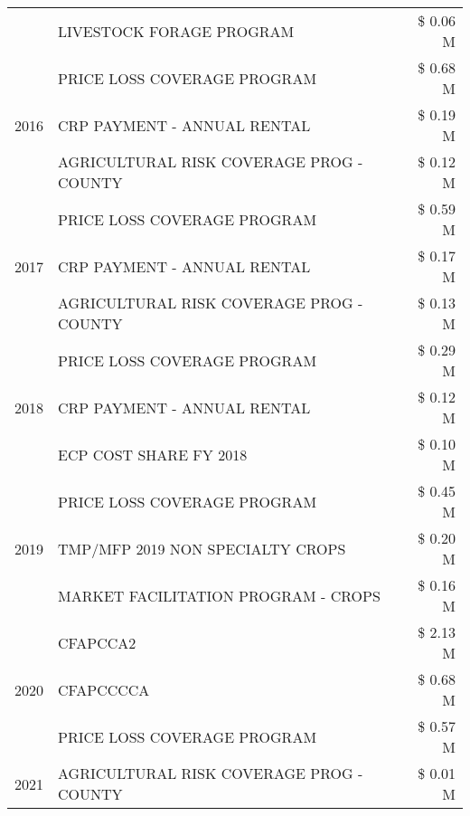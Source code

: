 \begin{tabular}{llr}
 & LIVESTOCK FORAGE PROGRAM & \$ 0.06 M \\
\cline{1-3}
\multirow[t]{3}{*}{2016} & PRICE LOSS COVERAGE PROGRAM                   & \$ 0.68 M \\
 & CRP PAYMENT - ANNUAL RENTAL                   & \$ 0.19 M \\
 & AGRICULTURAL RISK COVERAGE PROG - COUNTY      & \$ 0.12 M \\
\cline{1-3}
\multirow[t]{3}{*}{2017} & PRICE LOSS COVERAGE PROGRAM & \$ 0.59 M \\
 & CRP PAYMENT - ANNUAL RENTAL & \$ 0.17 M \\
 & AGRICULTURAL RISK COVERAGE PROG - COUNTY & \$ 0.13 M \\
\cline{1-3}
\multirow[t]{3}{*}{2018} & PRICE LOSS COVERAGE PROGRAM & \$ 0.29 M \\
 & CRP PAYMENT - ANNUAL RENTAL & \$ 0.12 M \\
 & ECP COST SHARE FY 2018 & \$ 0.10 M \\
\cline{1-3}
\multirow[t]{3}{*}{2019} & PRICE LOSS COVERAGE PROGRAM & \$ 0.45 M \\
 & TMP/MFP 2019 NON SPECIALTY CROPS & \$ 0.20 M \\
 & MARKET FACILITATION PROGRAM - CROPS & \$ 0.16 M \\
\cline{1-3}
\multirow[t]{3}{*}{2020} & CFAPCCA2 & \$ 2.13 M \\
 & CFAPCCCCA & \$ 0.68 M \\
 & PRICE LOSS COVERAGE PROGRAM & \$ 0.57 M \\
\cline{1-3}
2021 & AGRICULTURAL RISK COVERAGE PROG - COUNTY & \$ 0.01 M \\
\cline{1-3}
\bottomrule
\end{tabular}
